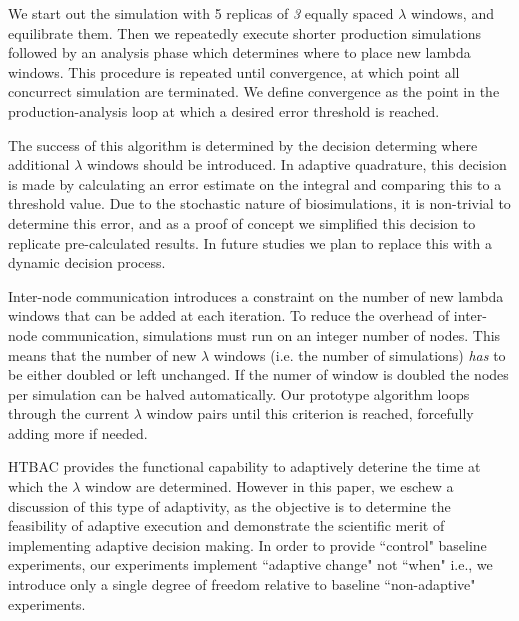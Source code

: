 We start out the simulation with 5 replicas of \emph{3} equally spaced
$\lambda$ windows, and equilibrate them. 
Then we repeatedly execute 
shorter production simulations followed by an analysis phase which determines where to
place new lambda windows. 
This procedure is repeated until convergence, at which point all
concurrect simulation are terminated. 
We define convergence as the point in
the production-analysis loop at which a desired error threshold is
reached. 

The success of this algorithm is determined by the decision determing 
where additional $\lambda$ windows should be introduced.
In adaptive quadrature, this decision is made by
calculating an error estimate on the integral and comparing this to a threshold value. 
Due to the stochastic nature of biosimulations, it is
non-trivial to determine this error, and as a proof of concept we simplified
this decision to replicate pre-calculated results. In future studies we plan
to replace this with a dynamic decision process.

Inter-node communication introduces a constraint on the number of new lambda windows that can be added at each iteration. 
To reduce the overhead of inter-node communication, simulations must run on an integer number of nodes. This means that the
number of new $\lambda$ windows (i.e. the number of simulations) \emph{has} to be
either doubled or left unchanged. 
If the numer of window is doubled the nodes per simulation can  be halved automatically. 
Our prototype algorithm loops through the current $\lambda$ window pairs until this criterion is reached, forcefully adding more if needed.




HTBAC provides the functional capability to adaptively deterine the time at
which the $\lambda$ window are determined. 
However in this paper, we eschew a
discussion of this type of adaptivity, as the objective is to determine the
feasibility of adaptive execution and demonstrate the scientific merit of
implementing adaptive decision making. In order to provide ``control" baseline
experiments, our experiments implement ``adaptive change" not ``when" i.e., we
introduce only a single degree of freedom relative to baseline ``non-adaptive"
experiments.

